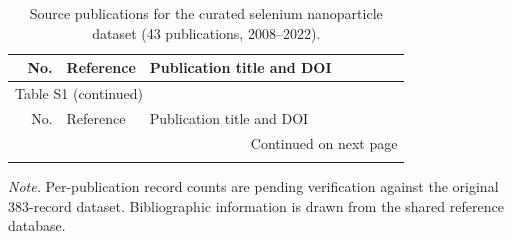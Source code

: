 \small
\setlength{\tabcolsep}{3.5pt}
\setlength{\LTleft}{0pt}
\setlength{\LTright}{0pt}
\renewcommand{\arraystretch}{1.12}
\begin{longtable}{r >{\raggedright\arraybackslash}p{0.21\linewidth} >{\raggedright\arraybackslash}p{0.66\linewidth}}
\caption{Source publications for the curated selenium nanoparticle dataset (43 publications, 2008--2022).}\label{tab:source-publications}\\
\toprule
No. & Reference & Publication title and DOI \\
\midrule
\endfirsthead
\multicolumn{3}{l}{Table S1 (continued)} \\
\toprule
No. & Reference & Publication title and DOI \\
\midrule
\endhead
\midrule
\multicolumn{3}{r}{Continued on next page} \\
\endfoot
\bottomrule
\endlastfoot

\end{longtable}
\noindent \textit{Note.} Per-publication record counts are pending verification against the original 383-record dataset. Bibliographic information is drawn from the shared reference database.
